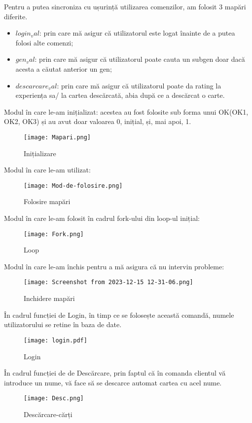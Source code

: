 \documentclass{article}
\begin{document}
Pentru a putea sincroniza cu ușurință utilizarea comenzilor, am folosit $3$ mapări diferite. 
\begin{itemize}
    \item $login_val$: prin care mă asigur că utilizatorul este logat înainte de a putea folosi alte comenzi;
    \item $gen_val$: prin care mă asigur că utilizatorul poate cauta un subgen doar dacă acesta a căutat anterior un gen;
    \item $descarcare_val$: prin care mă asigur că utilizatorul poate da rating la experiența sa/ la cartea descărcată, abia după ce a descărcat o carte.
\end{itemize}

Modul în care le-am inițializat: acestea au fost folosite sub forma unui OK(OK1, OK2, OK3) și au avut doar valoarea 0, inițial, și, mai apoi, 1.
\begin{figure}[h]
    \centering
    \texttt{[image: Mapari.png]}
    \caption{Inițializare}
    \label{fig:enter-label}
\end{figure}
\clearpage
Modul în care le-am utilizat: 
\begin{figure}[h]
    \centering
    \texttt{[image: Mod-de-folosire.png]}
    \caption{Folosire mapări}
    \label{fig:enter-label}
\end{figure}
\clearpage
Modul în care le-am folosit în cadrul fork-ului din loop-ul inițial:
\begin{figure}[h]
    \centering
    \texttt{[image: Fork.png]}
    \caption{Loop}
    \label{fig:enter-label}
\end{figure}
\clearpage
Modul în care le-am închis pentru a mă asigura că nu intervin probleme: 
\begin{figure}[h]
    \centering
    \texttt{[image: Screenshot from 2023-12-15 12-31-06.png]}
    \caption{Inchidere mapări}
    \label{fig:enter-label}
\end{figure}

În cadrul funcției de Login, în timp ce se folosește această comandă, numele utilizatorului se retine în baza de date.
\begin{figure}[h]
    \centering
    \texttt{[image: login.pdf]}
    \caption{Login}
    \label{fig:enter-label}
\end{figure}

\clearpage

În cadrul funcției de de Descărcare, prin faptul că în comanda clientul vă introduce un nume, vă face să se descarce automat cartea cu acel nume.
\begin{figure}[h]
    \centering
    \texttt{[image: Desc.png]}
    \caption{Descărcare-cărți}
    \label{fig:enter-label}
\end{figure}
\end{document}
